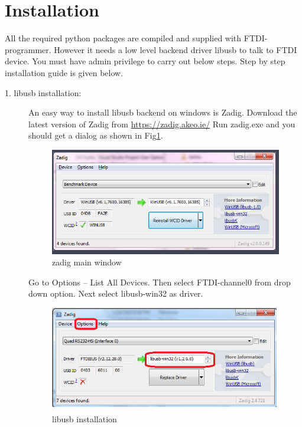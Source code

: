 \documentclass[a4paper,12pt]{report}%
\begin{document}
\section{Installation}\label{sec:install}
	All the required python packages are compiled and supplied with FTDI-programmer. However it needs a low level backend driver
	libusb to talk to FTDI device. You must have admin privilege to carry out below steps.
	Step by step installation guide is given below.
	\begin{description}
		\item [1. libusb installation:]
		An easy way to install libusb backend on windows is Zadig. Download the latest version of Zadig from \url{https://zadig.akeo.ie/} %
		Run zadig.exe and you should get a dialog as shown in Fig\ref{fig:zadig_main}.
		
			\begin{figure}[h]
				
				\centering
				\includegraphics[scale = 0.7]{zadig_main}
				\caption{zadig main window}
				\label{fig:zadig_main}
			\end{figure}
		
		
		
		Go to Options -- List All Devices. Then select FTDI-channel0 from drop down option. Next select libusb-win32 as driver.
			\begin{figure}[h]
				
				\centering
				\includegraphics[scale = 0.7]{zadig_libusb}
				\caption{libusb installation}
				\label{fig:zadig_libusb}
			\end{figure}
			

\end{description}
\end{document}
